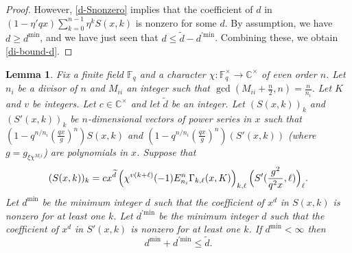 \documentclass[11pt,letterpaper]{article}
\newtheorem{lemma}[theorem]{Lemma}
\theoremstyle{definition}
\theoremstyle{remark}
\numberwithin{equation}{section}
\theoremstyle{dotless}
\renewcommand{\tilde}{\widetilde}
\begin{document}
\begin{proof}
However, \eqref{d-Snonzero} implies that the coefficient of $d$ in $(1-\eta' qx) \sum_{k =0}^{n-1} \eta^{k} S(x,k) $ is nonzero for some $d$. By assumption, we have $d \geq d^{\mathrm{min}}$, and we have just seen that $d \leq \tilde{d}- d^{'\mathrm{min}}$. Combining these, we obtain \eqref{di-bound-d}.
\end{proof}

\begin{lemma}\label{uniquely-determined-sv-k}  Fix a finite field $\mathbb F_q$ and a character $\chi \colon \mathbb F_q^\times \to \mathbb C^\times$ of even order $n$. Let $n_i$ be a divisor of $n$ and $M_{ii}$ an integer such that $\gcd( M_{ii} + \frac{n}{2}, n) =\frac{n}{n_i}$.  Let $K$ and $v$ be integers. Let $c\in \mathbb C^\times$ and let $\tilde{d}$ be an integer. Let $(S(x,k))_k$ and $(S'(x,k))_k$ be $n$-dimensional vectors of power series in $x$ such that $\left(1- q^{n/n_i} \left( \frac{q x}{g}\right)^{n} \right) S(x,k)$ and $(1- q^{n/n_i} \left( \frac{q x}{g}\right)^{n} ) (S'(x,k))$ (where $g=g_{\xi \chi^{M_ii}}$) are polynomials in $x$. Suppose that
\begin{equation}\label{ud-sv-k-fe} (S(x,k))_k = c x^{\tilde{d}} \left( \chi^{v (k+\ell)}(-1) E_{n_i}^n \Gamma_{k, \ell}(x, K) \right)_{k, \ell}   \Bigl(S'(\frac{g^2}{q^2x} ,\ell)\Bigr)_\ell.\end{equation} 
Let $d^{\mathrm{min}}$ be the minimum integer $d$ such that the coefficient of $x^d$ in $S(x,k)$ is nonzero for at least one $k$. Let $d^{'\mathrm{min}}$ be the minimum integer $d$ such that the coefficient of $x^d$ in $S'(x,k)$ is nonzero for at least one $k$.  
If $d^{\mathrm{min}}<\infty$ then \begin{equation} \label{di-bound-k} d^{\mathrm{min}}+d^{'\mathrm{min}} \leq \tilde{d}. \end{equation} \end{lemma}
\end{document}
